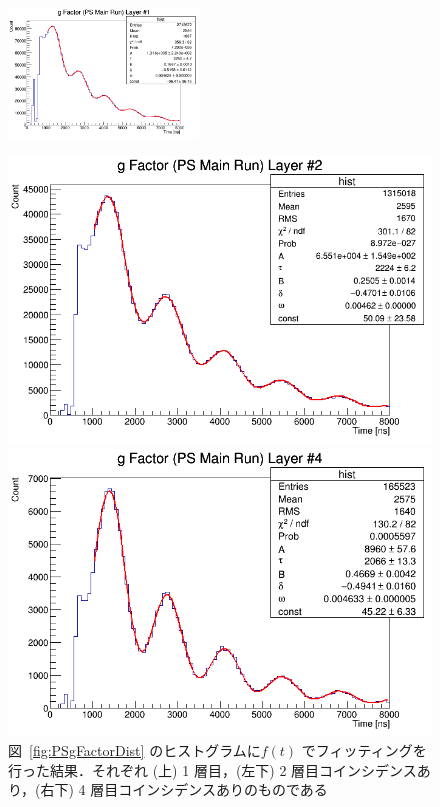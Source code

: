 \begin{figure}[h]
	\centering
	\includegraphics[width = 0.45\textwidth]{figure/odagawa/PSgFactorFit_Layer0.png}\\
	\begin{minipage}{0.45\textwidth}
	\centering
	\includegraphics[width = \textwidth]{figure/odagawa/PSgFactorFit_Layer1.png}
	\end{minipage}
	\begin{minipage}{0.45\textwidth}
	\centering
	\includegraphics[width = \textwidth]{figure/odagawa/PSgFactorFit_Layer3.png}
	\end{minipage}
	\caption{図~\ref{fig:PSgFactorDist} のヒストグラムに$f(t)$ でフィッティングを行った結果．それぞれ (上) 1 層目，(左下) 2 層目コインシデンスあり，(右下) 4 層目コインシデンスありのものである}
	\label{fig:PSgFactorFit}
\end{figure}%
